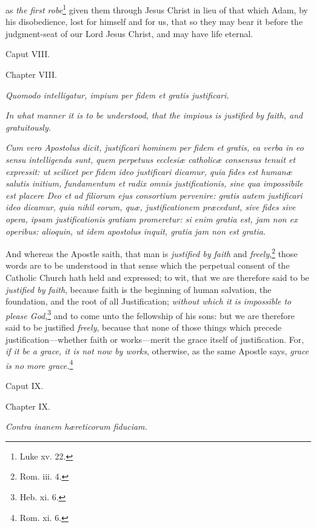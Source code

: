 as \emph{the first robe}\footnote{\par   Luke xv. 22.} given them through Jesus Christ in lieu of that which Adam, by his disobedience, lost for himself and for us, that so they may bear it before the judgment-seat of our Lord Jesus Christ, and may have life eternal.

Caput VIII.

Chapter VIII.

\emph{Quomodo intelligatur, impium per fidem et gratis justificari.}

\emph{In what manner it is to be understood, that the impious is justified by faith, and gratuitously.}

\emph{Cum vero Apostolus dicit, justificari hominem per fidem et gratis, ea verba in eo sensu intelligenda sunt, quem perpetuus ecclesiæ catholicæ consensus tenuit et expressit: ut scilicet per fidem ideo justificari dicamur, quia fides est humanæ salutis initium, fundamentum et radix omnis justificationis, sine qua impossibile est placere Deo et ad filiorum ejus consortium pervenire: gratis autem justificari ideo dicamur, quia nihil eorum, quæ, justificationem præcedunt, sive fides sive opera, ipsam justificationis gratiam promeretur: si enim gratia est, jam non ex operibus: alioquin, ut idem apostolus inquit, gratia jam non est gratia.}

And whereas the Apostle saith, that man is \emph{justified by faith} and \emph{freely},\footnote{\par   Rom. iii. 4.} those words are to be understood in that sense which the perpetual consent of the Catholic Church hath held and expressed; to wit, that we are therefore said to be \emph{justified by faith}, because faith is the beginning of human salvation, the foundation, and the root of all Justification; \emph{without which it is impossible to please God},\footnote{\par   Heb. xi. 6.} and to come unto the fellowship of his sons: but we are therefore said to be justified \emph{freely}, because that none of those things which precede justification—whether faith or works—merit the grace itself of justification. For, \emph{if it be a grace, it is not now by works}, otherwise, as the same Apostle says, \emph{grace is no more grace.}\footnote{\par   Rom. xi. 6.}

Caput IX.

Chapter IX.

\emph{Contra inanem hæreticorum fiduciam.}

